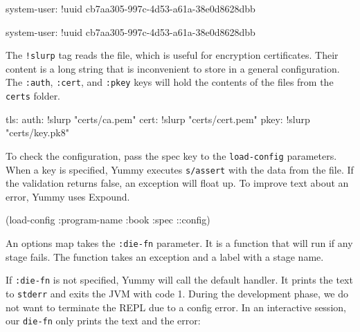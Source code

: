 \ifx\DEVICETYPE\MOBILE

\begin{english}
  \begin{yaml}
system-user: !uuid
    cb7aa305-997c-4d53-a61a-38e0d8628dbb
  \end{yaml}
\end{english}

\else

\begin{english}
  \begin{yaml}
system-user: !uuid cb7aa305-997c-4d53-a61a-38e0d8628dbb
  \end{yaml}
\end{english}

\fi

The \verb|!slurp| tag reads the file, which is useful for encryption certificates. Their content is a long string that is inconvenient to store in a general configuration. The \verb|:auth|, \verb|:cert|, and \verb|:pkey| keys will hold the contents of the files from the \verb|certs| folder.

\begin{english}
  \begin{yaml}
tls:
  auth: !slurp "certs/ca.pem"
  cert: !slurp "certs/cert.pem"
  pkey: !slurp "certs/key.pk8"
  \end{yaml}
\end{english}


To check the configuration, pass the spec key to the \verb|load-config| parameters. When a key is specified, Yummy executes \verb|s/assert| with the data from the file. If the validation returns false, an exception will float up. To improve text about an error, Yummy uses Expound.

\begin{english}
  \begin{clojure}
(load-config {:program-name :book
              :spec ::config})
  \end{clojure}
\end{english}


\mnoindent
An options map takes the \verb|:die-fn| parameter. It is a function that will run if any stage fails. The function takes an exception and a label with a stage name.


If \verb|:die-fn| is not specified, Yummy will call the default handler. It prints the text to \verb|stderr| and exits the JVM with code 1. During the development phase, we do not want to terminate the REPL due to a config error. In an interactive session, our \verb|die-fn| only prints the text and the error:

